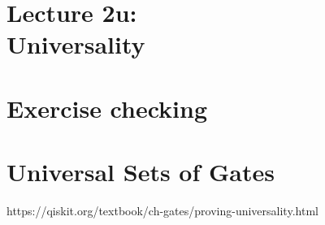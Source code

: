 \section{Lecture 2u: \\ Universality}
\SectionPage{}



\section{Exercise checking}
\SectionPage{}



\section{Universal Sets of Gates}
\SectionPage{}
https://qiskit.org/textbook/ch-gates/proving-universality.html







